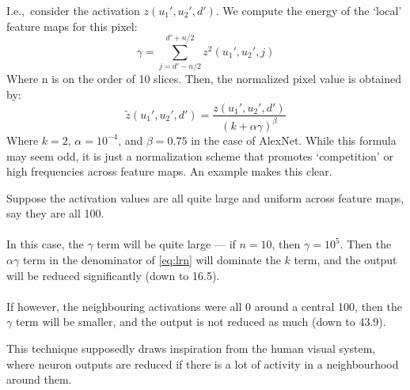       I.e.,\ consider the activation $z(u_1',u_2',d')$. We compute the energy of the
      `local' feature maps for this pixel:
      \begin{equation}
        \gamma = \sum_{j=d' - n/2}^{d' + n/2} z^2(u_1',u_2',j)
      \end{equation}
      Where n is on the order of 10 slices. 
      Then, the normalized pixel value is obtained by:
      \begin{equation}
        \tilde{z}{(u_1',u_2',d')} = \frac{z(u_1',u_2',d')}{{(k + \alpha
        \gamma)}^\beta} \label{eq:lrn}
      \end{equation}
      Where $k=2$, $\alpha=10^{-4}$, and $\beta = 0.75$ in the case of AlexNet.
      While this formula may seem odd, it is just a normalization scheme that
      promotes `competition' or high frequencies across feature maps. An
      example makes this clear. 
      \begin{exmp}
        Suppose the activation values are all quite large and uniform across
        feature maps, say they are all 100.\\\\ 
        In this case, the $\gamma$ term
        will be quite large --- if $n=10$, then $\gamma=10^5$. Then the
        $\alpha\gamma$ term in the denominator of \autoref{eq:lrn} will
        dominate the $k$ term, and the output will be reduced significantly
        (down to 16.5). \\\\
				If however, the neighbouring activations were all
        0 around a central 100, then the $\gamma$ term will be smaller, and the
        output is not reduced as much (down to 43.9).
      \end{exmp}

      This technique supposedly draws inspiration from the human visual system,
      where neuron outputs are reduced if there is a lot of activity in
      a neighbourhood around them.

